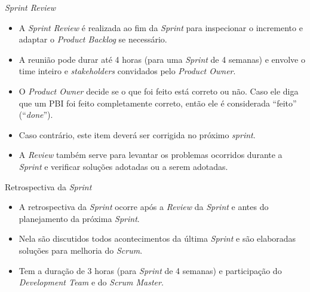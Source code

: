 \documentclass[11pt]{beamer}
\begin{document}
    \begin{frame}{\textit{Sprint Review}}
      \begin{itemize}
         \item A \textit{Sprint Review} é realizada ao fim da \textit{Sprint} para inspecionar o incremento e adaptar o \textit{Product Backlog} se necessário.
         \item A reunião pode durar até 4 horas (para uma \textit{Sprint} de 4 semanas) e envolve o time inteiro e \textit{stakeholders} convidados pelo \textit{Product Owner}.
         \item O \textit{Product Owner} decide se o que foi feito está correto ou não. Caso ele diga que um PBI foi feito completamente correto, então ele é considerada ``feito'' (``\textit{done}'').
         \item Caso contrário, este item deverá ser corrigida no próximo \textit{sprint}.
         \item A \textit{Review} também serve para levantar os problemas ocorridos durante a \textit{Sprint} e verificar soluções adotadas ou a serem adotadas.
      \end{itemize}
    \end{frame}

    \begin{frame}{Retrospectiva da \textit{Sprint}}
      \begin{itemize}
         \item A retrospectiva da \textit{Sprint} ocorre após a \textit{Review} da \textit{Sprint} e antes do planejamento da próxima \textit{Sprint}.
         \item Nela são discutidos todos acontecimentos da última \textit{Sprint} e são elaboradas soluções para melhoria do \textit{Scrum}.
         \item Tem a duração de 3 horas (para \textit{Sprint} de 4 semanas) e participação do \textit{Development Team} e do \textit{Scrum Master}.
      \end{itemize}
    \end{frame}
\end{document}
